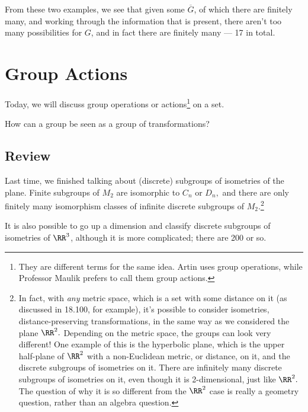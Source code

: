 From these two examples, we see that given some $\overline{G}$, of which there are finitely many, and working through the information that is present, there aren't too many possibilities for $G$, and in fact there are finitely many --- 17 in total. 

\newpage


\section{Group Actions}

Today, we will discuss group operations or actions\footnote{They are different terms for the same idea. Artin uses group operations, while Professor Maulik prefers to call them group actions.} on a set.
\begin{qq}
How can a group be seen as a group of transformations?%
\end{qq}

\subsection{Review}
Last time, we finished talking about (discrete) subgroups of isometries of the plane. Finite subgroups of $M_2$ are isomorphic to $C_n$ or $D_n,$ and there are only finitely many isomorphism classes of infinite discrete subgroups of $M_2$.\footnote{In fact, with \emph{any} metric space, which is a set with some distance on it (as discussed in 18.100, for example), it's possible to consider isometries, distance-preserving transformations, in the same way as we considered the plane $\RR^2.$ Depending on the metric space, the groups can look very different! One example of this is the hyperbolic plane, which is the upper half-plane of $\RR^2$ with a non-Euclidean metric, or distance, on it, and the discrete subgroups of isometries on it. There are infinitely many discrete subgroups of isometries on it, even though it is 2-dimensional, just like $\RR^2.$ The question of why it is so different from the $\RR^2$ case is really a geometry question, rather than an algebra question.} 

It is also possible to go up a dimension and classify discrete subgroups of isometries of $\RR^3$, although it is more complicated; there are 200 or so. 



